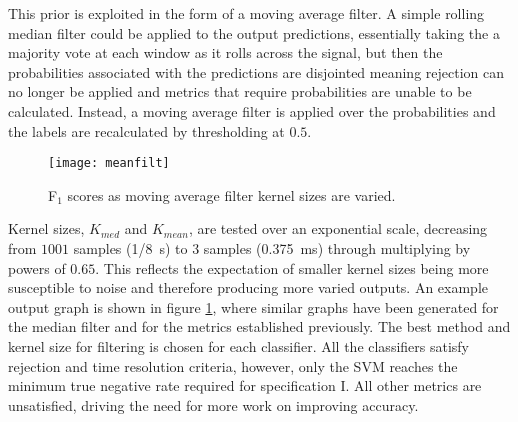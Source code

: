         This prior is exploited in the form of a moving average filter. A simple rolling median filter could be applied to the output predictions, essentially taking the a majority vote at each window as it rolls across the signal, but then the probabilities associated with the predictions are disjointed meaning rejection can no longer be applied and metrics that require probabilities are unable to be calculated. Instead, a moving average filter is applied over the probabilities and the labels are recalculated by thresholding at $0.5$.
        \begin{figure}[ht]
            \centering
            \texttt{[image: meanfilt]}
            \caption{F$_{1}$ scores as moving average filter kernel sizes are varied.}
            \label{fig:exp-postproc-filt}
        \end{figure}
        Kernel sizes, $K_{med}$ and $K_{mean}$, are tested over an exponential scale, decreasing from $1001$ samples (\SI{1/8}{\second}) to $3$ samples (\SI{0.375}{\milli\second}) through multiplying by powers of $0.65$. This reflects the expectation of smaller kernel sizes being more susceptible to noise and therefore producing more varied outputs. An example output graph is shown in figure \ref{fig:exp-postproc-filt}, where similar graphs have been generated for the median filter and for the metrics established previously. The best method and kernel size for filtering is chosen for each classifier. All the classifiers satisfy rejection and time resolution criteria, however, only the SVM reaches the minimum true negative rate required for specification I. All other metrics are unsatisfied, driving the need for more work on improving accuracy.

